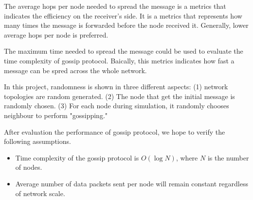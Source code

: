 The average hops per node needed to spread the message is a metrics that indicates the efficiency on the receiver's side. It is a metrics that represents how many times the message is forwarded before the node received it. Generally, lower average hops per node is preferred. 

The maximum time needed to spread the message could be used to evaluate the time complexity of gossip protocol. Baically, this metrics indicates how fast a message can be spred across the whole network.  

In this project, randomness is shown in three different aspects: (1) network topologies are random generated. (2) The node that get the initial message is randomly chosen. (3) For each node during simulation, it randomly chooses neighbour to perform "gossipping." 

After evaluation the performance of gossip protocol, we hope to verify the following assumptions.
\begin{itemize}
	\item Time complexity of the gossip protocol is $O(\log N)$, where $N$ is the number of nodes.
	\item Average number of data packets sent per node will remain constant regardless of network scale.
\end{itemize}

